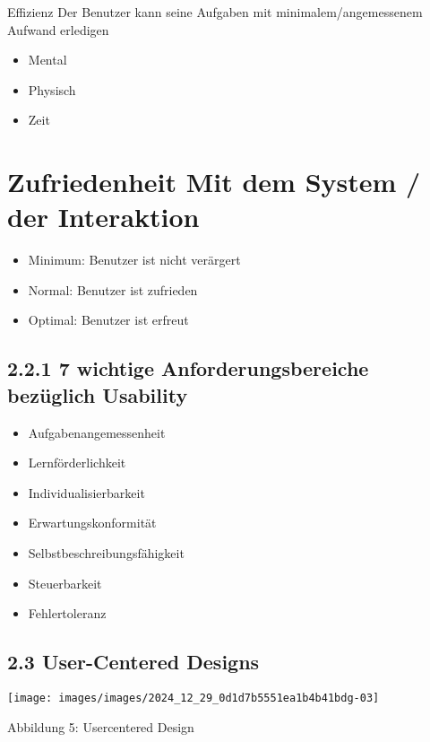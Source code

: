 Effizienz Der Benutzer kann seine Aufgaben mit minimalem/angemessenem Aufwand erledigen

\begin{itemize}
  \item Mental
  \item Physisch
  \item Zeit
\end{itemize}

\section*{Zufriedenheit Mit dem System / der Interaktion}
\begin{itemize}
  \item Minimum: Benutzer ist nicht verärgert
  \item Normal: Benutzer ist zufrieden
  \item Optimal: Benutzer ist erfreut
\end{itemize}

\subsection*{2.2.1 7 wichtige Anforderungsbereiche bezüglich Usability}
\begin{itemize}
  \item Aufgabenangemessenheit
  \item Lernförderlichkeit
  \item Individualisierbarkeit
  \item Erwartungskonformität
  \item Selbstbeschreibungsfähigkeit
  \item Steuerbarkeit
  \item Fehlertoleranz
\end{itemize}

\subsection*{2.3 User-Centered Designs}
\begin{center}
\texttt{[image: images/images/2024\_12\_29\_0d1d7b5551ea1b4b41bdg-03]}
\end{center}

Abbildung 5: Usercentered Design


